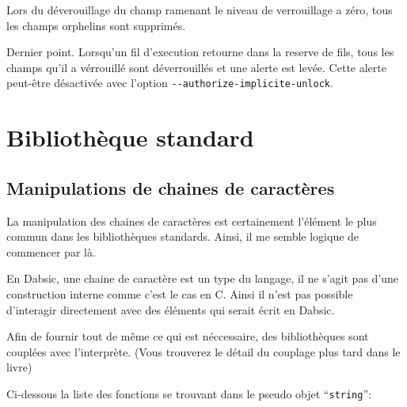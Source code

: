 \documentclass[a5paper, 12pt]{book}
\begin{document}
Lors du déverouillage du champ ramenant le niveau de verrouillage a zéro, tous
les champs orphelins sont supprimés.

Dernier point. Lorsqu'un fil d'execution retourne dans la reserve de fils, tous
les champs qu'il a vérrouillé sont déverrouillés et une alerte est levée. Cette
alerte peut-être désactivée avec l'option \verb!--authorize-implicite-unlock!.


\part{Bibliothèque standard}

\chapter{Manipulations de chaines de caractères}

La manipulation des chaines de caractères est certainement l'élément le
plus commun dans les bibliothèques standards. Ainsi, il me semble
logique de commencer par là.

En Dabsic, une chaine de caractère est un type du langage,
il ne s'agit pas d'une construction interne comme c'est le
cas en C. Ainsi il n'est pas possible d'interagir directement
avec des éléments qui serait écrit en Dabsic.

Afin de fournir tout de même ce qui est néccessaire, des
bibliothèques sont couplées avec l'interprète. (Vous trouverez
le détail du couplage plus tard dans le livre)

Ci-dessous la liste des fonctions se trouvant dans le pseudo objet ``\verb!string!'':
\end{document}
